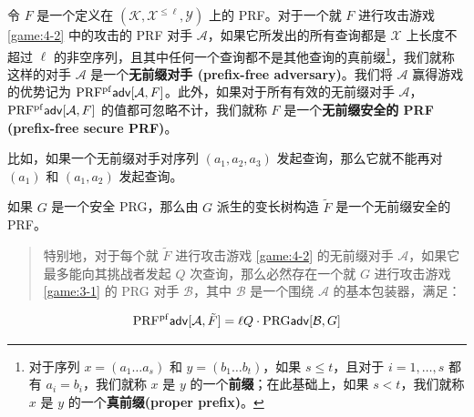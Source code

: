 \begin{definition}\label{def:4-5}
令 $F$ 是一个定义在 $(\mathcal{K},\mathcal{X}^{\leq\ell}, \mathcal{Y})$ 上的 PRF。对于一个就 $F$ 进行攻击游戏 \ref{game:4-2} 中的攻击的 PRF 对手 $\mathcal{A}$，如果它所发出的所有查询都是 $\mathcal{X}$ 上长度不超过 $\ell$ 的非空序列，且其中任何一个查询都不是其他查询的真前缀\footnote[3]{对于序列 $x=(a_1\dots a_s)$ 和 $y=(b_1\dots b_t)$，如果 $s\leq t$，且对于 $i=1,\dots,s$ 都有 $a_i=b_i$，我们就称 $x$ 是 $y$ 的一个\textbf{前缀}；在此基础上，如果 $s<t$，我们就称 $x$ 是 $y$ 的一个\textbf{真前缀(proper prefix)}。}，我们就称这样的对手 $\mathcal{A}$ 是一个\textbf{无前缀对手 (prefix-free adversary)}。我们将 $\mathcal{A}$ 赢得游戏的优势记为 ${\rm PRF^{pf}\mathsf{adv}}[\mathcal{A},F]$。此外，如果对于所有有效的无前缀对手 $\mathcal{A}$，${\rm PRF^{pf}\mathsf{adv}}[\mathcal{A},F]$ 的值都可忽略不计，我们就称 $F$ 是一个\textbf{无前缀安全的 PRF (prefix-free secure PRF)}。
\end{definition}

比如，如果一个无前缀对手对序列 $(a_1,a_2,a_3)$ 发起查询，那么它就不能再对 $(a_1)$ 和 $(a_1,a_2)$ 发起查询。

\begin{theorem}\label{theo:4-11}
如果 $G$ 是一个安全 PRG，那么由 $G$ 派生的变长树构造 $\tilde F$ 是一个无前缀安全的 PRF。
\begin{quote}
特别地，对于每个就 $\tilde F$ 进行攻击游戏 \ref{game:4-2} 的无前缀对手 $\mathcal{A}$，如果它最多能向其挑战者发起 $Q$ 次查询，那么必然存在一个就 $G$ 进行攻击游戏 \ref{game:3-1} 的 PRG 对手 $\mathcal{B}$，其中 $\mathcal{B}$ 是一个围绕 $\mathcal{A}$ 的基本包装器，满足：
\end{quote}
\[
{\rm PRF^{pf}\mathsf{adv}}[\mathcal{A},\tilde{F}]=\ell Q\cdot{\rm PRG\mathsf{adv}}[\mathcal{B},G]
\]
\end{theorem}

